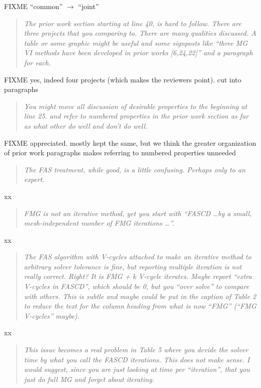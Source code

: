\documentclass[letterpaper,final,12pt,reqno]{amsart}
\newenvironment{review}%
{\bigskip \par \begin{quote} \selectfont \sl}%
{\end{quote}}
\newcommand\short[1]{\medskip\noindent #1}   %
\begin{document}
\short{FIXME ``common'' $\to$ ``joint''}

\begin{review}
The prior work section starting at line 40, is hard to follow.  There are three projects that you comparing to.  There are many qualities discussed.  A table or some graphic might be useful and some signposts like ``three MG VI methods have been developed in prior works [6,24,22]'' and a paragraph for each.
\end{review}

\short{FIXME yes, indeed four projects (which makes the reviewers point). cut into paragraphs}

\begin{review}
You might move all discussion of desirable properties to the beginning at line 25. and refer to numbered properties in the prior work section as far as what other do well and don't do well.
\end{review}

\short{FIXME appreciated.  mostly kept the same, but we think the greater organization of prior work paragraphs makes referring to numbered properties unneeded}

\begin{review}
The FAS treatment, while good, is a little confusing.  Perhaps only to an expert.
\end{review}

\short{xx}

\begin{review}
FMG is not an iterative method, yet you start with ``FASCD \dots by a small, mesh-independent number of FMG iterations \dots''.
\end{review}

\short{xx}

\begin{review}
The FAS algorithm with V-cycles attached to make an iterative method to arbitrary solver tolerance is fine, but reporting multiple iteration is not really correct.  Right?  It is FMG + k V-cycle iterates.  Maybe report ``extra V-cycles in FASCD'', which should be 0, but you ``over solve'' to compare with others.  This is subtle and maybe could be put in the caption of Table 2 to reduce the text for the column heading from what is now ``FMG'' (``FMG V-cycles'' maybe).
\end{review}

\short{xx}


\begin{review}
This issue becomes a real problem in Table 5 where you devide the solver time by what you call the FASCD iterations.  This does not make sense. I would suggest, since you are just looking at time per ``iteration'', that you just do full MG and forget about iterating.
\end{review}
\end{document}
